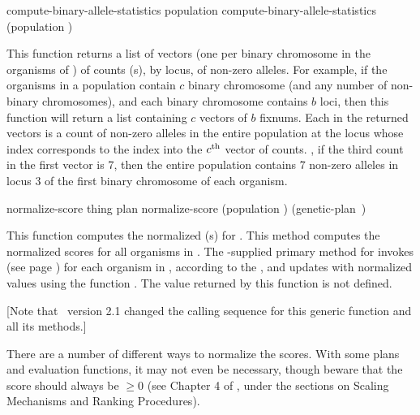 {\filbreak

{\samepage
\Defgeneric compute-binary-allele-statistics {population}
 compute-binary-allele-statistics {(population )}

This function returns a list of vectors (one per binary chromosome in the
organisms of ) of counts (s), by locus, of non-zero
alleles. For example, if the organisms in a population contain $c$ binary
chromosome (and any number of non-binary chromosomes), and each binary chromosome
contains $b$ loci, then this function will return a list containing $c$ vectors
of $b$ fixnums. Each  in the returned vectors is a count of non-zero
alleles in the entire population at the locus whose index corresponds to the
index into the $c^{\rm th}$ vector of counts. \Eg, if the third count in the
first vector is 7, then the entire population contains 7 non-zero alleles in
locus 3 of the first binary chromosome of each organism.
\par}%

\filbreak

{\samepage
\Defgeneric normalize-score {thing plan}
 normalize-score {(population )
                            \hbox{(genetic-plan )}}

This function computes the normalized
(s) for .
This method computes the normalized scores for all organisms in .
The \geco-supplied primary method for  invokes
 (see page \pageref{method:normalize-score:organism})
for each organism in , according to the , and
updates  with normalized values using the function
.
The value returned by this function is not defined.

[Note that \geco\ version 2.1 changed the calling sequence for this generic function and all its methods.]
\par}%

\filbreak

There are a number of different ways to normalize the
scores. With some plans and evaluation functions, it may not even be necessary,
though beware that the score should always be $\ge 0$ (see Chapter 4 of
\cite{ga:goldberg}, under the sections on Scaling Mechanisms and Ranking
Procedures).

}
